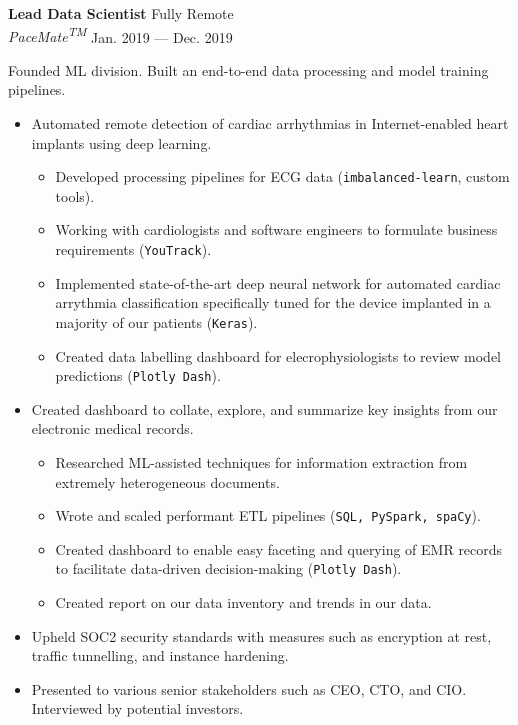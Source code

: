 \documentclass[a4paper,12pt]{article}
\newcommand{\ressubheading}[4]{{\begin{minipage}{\textwidth}
                                    \textbf{#1} \hfill #2 \\
                                    \textit{#3} \hfill #4 \\
\end{minipage}}}
\begin{document}
    \ressubheading{Lead Data Scientist}{Fully Remote}{PaceMate\textsuperscript{TM}}{Jan. 2019 --- Dec. 2019}

    \vspace{-6pt} Founded ML division. Built an end-to-end data processing and model training pipelines.

    \begin{itemize}

        \item  Automated remote detection of cardiac arrhythmias in Internet-enabled heart implants using deep learning.
        \begin{itemize}
            \item Developed processing pipelines for ECG data (\texttt{imbalanced-learn}, custom tools).
            \item Working with cardiologists and software engineers to formulate business requirements (\texttt{YouTrack}).
            \item Implemented state-of-the-art deep neural network for automated cardiac arrythmia classification specifically tuned for the device implanted in a majority of our patients (\texttt{Keras}).
            \item Created data labelling dashboard for elecrophysiologists to review model predictions (\texttt{Plotly Dash}).
        \end{itemize}

        \item Created dashboard to collate, explore, and summarize key insights from our electronic medical records.
        \begin{itemize}
            \item Researched ML-assisted techniques for information extraction from extremely heterogeneous documents.
            \item Wrote and scaled performant ETL pipelines (\texttt{SQL, PySpark, spaCy}).
            \item Created dashboard to enable easy faceting and querying of EMR records to facilitate data-driven decision-making (\texttt{Plotly Dash}).
            \item Created report on our data inventory and trends in our data.
        \end{itemize}


        \item Upheld SOC2 security standards with measures such as encryption at rest, traffic tunnelling, and instance hardening.
        \item Presented to various senior stakeholders such as CEO, CTO, and CIO. Interviewed by potential investors.

    \end{itemize}
\end{document}

